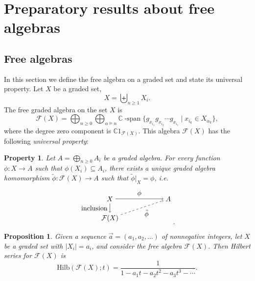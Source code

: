 \documentclass[11pt]{amsart}
\newtheorem{proposition}[theorem]{Proposition}
\newtheorem{property}[theorem]{Property}
\theoremstyle{definition}
\numberwithin{equation}{section}
\def\CC{{\mathbb C}}
\begin{document}
\section{Preparatory results about free algebras}

\subsection{Free algebras}
\label{sec:freealgebras}

In this section we define the free algebra on a graded set and state its universal property.  
Let $X$ be a graded set, 
\[
X = \biguplus_{n \ge 1} X_{i}.
\]
The free graded algebra on the set $X$ is 
\[
\mathcal{F}(X) = \bigoplus_{n \ge 0} \bigoplus_{\alpha \vDash n} 
\CC\operatorname{-span}\{g_{x_{i_{1}} }g_{x_{i_{2}}} \cdots g_{x_{i_{\ell}}} \;|\; x_{i_{k}} \in X_{\alpha_{k}}\},
\]
where the degree zero component is $\CC 1_{\mathcal{F}(X)}$.  This algebra $\mathcal{F}(X)$ has the following \emph{universal property}:

\begin{property}
\label{prop:universalfree}
Let $A = \bigoplus_{n \ge 0} A_{i}$ be a graded algebra.  For every function $\phi: X \to A$ such that $\phi(X_{i}) \subseteq A_{i}$, there exists a unique graded algebra homomorphism $\tilde{\phi}: \mathcal{F}(X) \to A$ such that $\tilde{\phi}|_{X} = \phi$, i.e.
\[
    \begin{tikzpicture}
        \node at (0, 0) (X) {$X$};
        \node at (3, 0) (F) {$A$};
        \node at (0, -1) (A) {$\mathcal{F}(X)$};
        \draw[->] (X) -- node[above] {$\phi$} (F);
        \draw[->] (X) -- node[left] {inclusion} (A);
        \draw[->, dashed] (A) -- node[below right] {$\tilde{\phi}$} (F);
        \end{tikzpicture}.
\]
\end{property}


\begin{proposition}
Given a sequence $\vec{a} = (a_{1}, a_{2}, \ldots)$ of nonnegative integers, let $X$ be a graded set with $|X_{i}| = a_{i}$, and consider the free algebra $\mathcal{F}(X)$.  Then Hilbert series for $\mathcal{F}(X)$ is
\[
\mathrm{Hilb}(\mathcal{F}(X); t) =  \frac{1}{1 - a_{1}t - a_{2}t^{2} - a_{3}t^{3} - \cdots}.
\]
%
%
%
%
%
%
%
%
\end{proposition}
\end{document}
